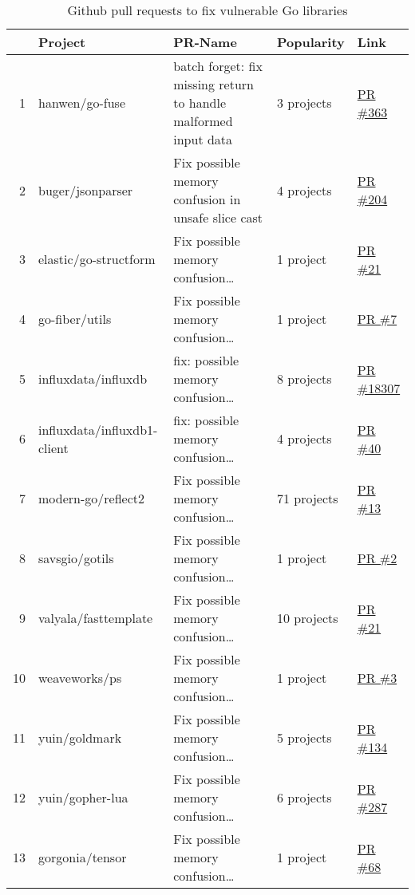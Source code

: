 \begin{table}[h]
    \centering
    \caption{Github pull requests to fix vulnerable Go libraries}
    \label{tbl:pull-requests}
    \begin{tabularx}{\textwidth}{rlXll}
        \toprule
        {} & Project & PR-Name & Popularity & Link \\
        \midrule
        1  & hanwen/go-fuse & batch forget: fix missing return to handle malformed input data & 3 projects & \href{https://www.github.com/hanwen/go-fuse/pull/363}{PR \#363} \\
        2  & buger/jsonparser & Fix possible memory confusion in unsafe slice cast & 4 projects & \href{https://www.github.com/buger/jsonparser/pull/204}{PR \#204} \\
        3  & elastic/go-structform & Fix possible memory confusion\ldots & 1 project & \href{https://github.com/elastic/go-structform/pull/21}{PR \#21} \\
        4  & go-fiber/utils & Fix possible memory confusion\ldots & 1 project & \href{https://github.com/gofiber/utils/pull/7}{PR \#7} \\
        5  & influxdata/influxdb & fix: possible memory confusion\ldots & 8 projects & \href{https://github.com/influxdata/influxdb/pull/18307}{PR \#18307} \\
        6  & influxdata/influxdb1-client & fix: possible memory confusion\ldots & 4 projects & \href{https://github.com/influxdata/influxdb1-client/pull/40}{PR \#40} \\
        7  & modern-go/reflect2 & Fix possible memory confusion\ldots & 71 projects & \href{https://github.com/modern-go/reflect2/pull/13}{PR \#13} \\
        8  & savsgio/gotils & Fix possible memory confusion\ldots & 1 project & \href{https://github.com/savsgio/gotils/pull/2}{PR \#2} \\
        9  & valyala/fasttemplate & Fix possible memory confusion\ldots & 10 projects & \href{https://github.com/valyala/fasttemplate/pull/21}{PR \#21} \\
        10 & weaveworks/ps & Fix possible memory confusion\ldots & 1 project & \href{https://github.com/weaveworks/ps/pull/3}{PR \#3} \\
        11 & yuin/goldmark & Fix possible memory confusion\ldots & 5 projects & \href{https://github.com/yuin/goldmark/pull/134}{PR \#134} \\
        12 & yuin/gopher-lua & Fix possible memory confusion\ldots & 6 projects & \href{https://github.com/yuin/gopher-lua/pull/287}{PR \#287} \\
        13 & gorgonia/tensor & Fix possible memory confusion\ldots & 1 project & \href{https://github.com/gorgonia/tensor/pull/68}{PR \#68} \\
        \bottomrule
    \end{tabularx}
\end{table}

